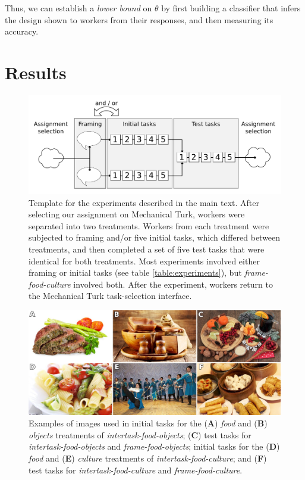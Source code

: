 \documentclass{sigchi}
\begin{document}
Thus, we can establish a \textit{lower bound} on $\theta$ by first 
building a classifier that infers the design shown to workers from their 
responses, and then measuring its accuracy.

\section{Results}
\begin{figure}
	\includegraphics[scale=0.36]{figs/task-schematic-2.pdf}
	\caption{
	  Template for the experiments described in the main text.
	  After selecting our assignment on Mechanical 
	  Turk, workers were separated into two treatments.
	  Workers from each treatment were subjected to framing and/or
	  five initial tasks, which differed between treatments, and then 
	  completed a set of five test tasks that were identical for both
	  treatments.  Most experiments involved either framing or initial
	  tasks (see table \ref{table:experiments}), 
	  but \textit{frame-food-culture} involved both.
	  After the experiment, workers return to the Mechanical Turk 
	  task-selection interface.
	}
	\label{fig:task-schematic}
\end{figure}


\begin{figure}
	\centering
	\includegraphics[scale=1.0]{figs/images.jpg}
	\caption{
		Examples of images used in
		initial tasks for the (\textbf{A}) \textit{food} and (\textbf{B}) 
		\textit{objects} treatments of \textit{intertask-food-objects};
		(\textbf{C}) test tasks for \textit{intertask-food-objects} and 
		\textit{frame-food-objects};
		initial tasks for the (\textbf{D}) \textit{food} and (\textbf{E}) 
		\textit{culture} treatments of \textit{intertask-food-culture};
		and (\textbf{F}) test tasks for \textit{intertask-food-culture} and 
		\textit{frame-food-culture}.
	}

	\label{fig:task}
\end{figure}
\end{document}
